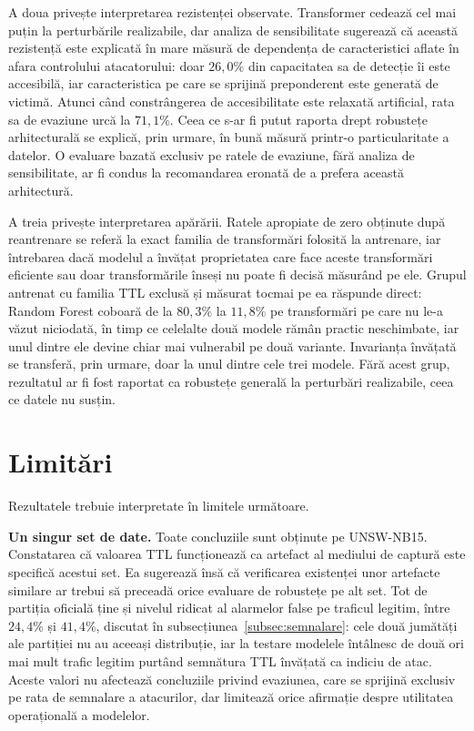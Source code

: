 A doua privește interpretarea rezistenței observate. Transformer cedează cel mai puțin la perturbările realizabile, dar analiza de sensibilitate sugerează că această rezistență este explicată în mare măsură de dependența de caracteristici aflate în afara controlului atacatorului: doar $26{,}0\%$ din capacitatea sa de detecție îi este accesibilă, iar caracteristica pe care se sprijină preponderent este generată de victimă. Atunci când constrângerea de accesibilitate este relaxată artificial, rata sa de evaziune urcă la $71{,}1\%$. Ceea ce s-ar fi putut raporta drept robustețe arhitecturală se explică, prin urmare, în bună măsură printr-o particularitate a datelor. O evaluare bazată exclusiv pe ratele de evaziune, fără analiza de sensibilitate, ar fi condus la recomandarea eronată de a prefera această arhitectură.

A treia privește interpretarea apărării. Ratele apropiate de zero obținute după reantrenare se referă la exact familia de transformări folosită la antrenare, iar întrebarea dacă modelul a învățat proprietatea care face aceste transformări eficiente sau doar transformările înseși nu poate fi decisă măsurând pe ele. Grupul antrenat cu familia TTL exclusă și măsurat tocmai pe ea răspunde direct: Random Forest coboară de la $80{,}3\%$ la $11{,}8\%$ pe transformări pe care nu le-a văzut niciodată, în timp ce celelalte două modele rămân practic neschimbate, iar unul dintre ele devine chiar mai vulnerabil pe două variante. Invarianța învățată se transferă, prin urmare, doar la unul dintre cele trei modele. Fără acest grup, rezultatul ar fi fost raportat ca robustețe generală la perturbări realizabile, ceea ce datele nu susțin.

\section{Limitări}\label{sec:limitari}

Rezultatele trebuie interpretate în limitele următoare.

\textbf{Un singur set de date.} Toate concluziile sunt obținute pe UNSW-NB15. Constatarea că valoarea TTL funcționează ca artefact al mediului de captură este specifică acestui set. Ea sugerează însă că verificarea existenței unor artefacte similare ar trebui să preceadă orice evaluare de robustețe pe alt set. Tot de partiția oficială ține și nivelul ridicat al alarmelor false pe traficul legitim, între $24{,}4\%$ și $41{,}4\%$, discutat în subsecțiunea~\ref{subsec:semnalare}: cele două jumătăți ale partiției nu au aceeași distribuție, iar la testare modelele întâlnesc de două ori mai mult trafic legitim purtând semnătura TTL învățată ca indiciu de atac. Aceste valori nu afectează concluziile privind evaziunea, care se sprijină exclusiv pe rata de semnalare a atacurilor, dar limitează orice afirmație despre utilitatea operațională a modelelor.

